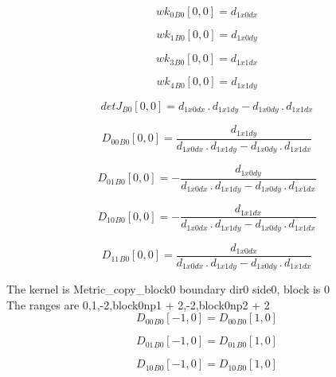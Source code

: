 \documentclass{article}
\begin{document}
\begin{dmath}{wk_{0}{_{B0}}}[{0,0}] = d_{1 x0 dx}\end{dmath}

\begin{dmath}{wk_{1}{_{B0}}}[{0,0}] = d_{1 x0 dy}\end{dmath}

\begin{dmath}{wk_{3}{_{B0}}}[{0,0}] = d_{1 x1 dx}\end{dmath}

\begin{dmath}{wk_{4}{_{B0}}}[{0,0}] = d_{1 x1 dy}\end{dmath}

\begin{dmath}{detJ{_{B0}}}[{0,0}] = d_{1 x0 dx} \,.\, d_{1 x1 dy} - d_{1 x0 dy} \,.\, d_{1 x1 dx}\end{dmath}

\begin{dmath}{D_{00}{_{B0}}}[{0,0}] = \frac{d_{1 x1 dy}}{d_{1 x0 dx} \,.\, d_{1 x1 dy} - d_{1 x0 dy} \,.\, d_{1 x1 dx}}\end{dmath}

\begin{dmath}{D_{01}{_{B0}}}[{0,0}] = - \frac{d_{1 x0 dy}}{d_{1 x0 dx} \,.\, d_{1 x1 dy} - d_{1 x0 dy} \,.\, d_{1 x1 dx}}\end{dmath}

\begin{dmath}{D_{10}{_{B0}}}[{0,0}] = - \frac{d_{1 x1 dx}}{d_{1 x0 dx} \,.\, d_{1 x1 dy} - d_{1 x0 dy} \,.\, d_{1 x1 dx}}\end{dmath}

\begin{dmath}{D_{11}{_{B0}}}[{0,0}] = \frac{d_{1 x0 dx}}{d_{1 x0 dx} \,.\, d_{1 x1 dy} - d_{1 x0 dy} \,.\, d_{1 x1 dx}}\end{dmath}

\noindent The kernel is Metric_copy_block0 boundary dir0 side0, block is 0\\\noindent The ranges are 0,1,-2,block0np1 + 2,-2,block0np2 + 2\\\begin{dmath}{D_{00}{_{B0}}}[{-1,0}] = {D_{00}{_{B0}}}[{1,0}]\end{dmath}

\begin{dmath}{D_{01}{_{B0}}}[{-1,0}] = {D_{01}{_{B0}}}[{1,0}]\end{dmath}

\begin{dmath}{D_{10}{_{B0}}}[{-1,0}] = {D_{10}{_{B0}}}[{1,0}]\end{dmath}
\end{document}
